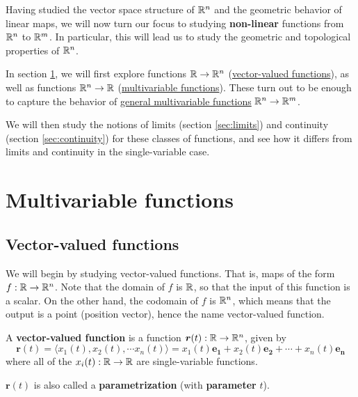 Having studied the vector space structure of $\mathbb{R}^n$ and the geometric behavior of linear maps, we will now turn our focus to studying  \textbf{non-linear}  functions from $\mathbb{R}^n$ to $\mathbb{R}^m$.  In particular, this will lead us to study the geometric and topological properties of $\mathbb{R}^n$. 

In section \ref{sec:multifunctions}, we will first explore functions $\mathbb{R} \to \mathbb{R}^n$ (\hyperref[vectorvaluedfunctions]{vector-valued functions}), as well as functions $\mathbb{R}^n \to \mathbb{R}$ (\hyperref[multivariablefunctions]{multivariable functions}).  These turn out to be enough to capture the behavior of \hyperref[generalmulti]{general multivariable functions} $\mathbb{R}^n \to \mathbb{R}^m$.

We will then study the notions of limits (section \ref{sec:limits}) and continuity  (section \ref{sec:continuity}) for these classes of functions, and see how it differs from limits and continuity in the single-variable case.


\section{Multivariable functions}\label{sec:multifunctions}

\subsection{Vector-valued functions}\label{vectorvaluedfunctions}

We will begin by studying vector-valued functions.  That is, maps of the form $f : \mathbb{R} \to \mathbb{R}^n$.  Note that the domain of $f$ is $\mathbb{R}$, so that the input of this function is a scalar.  On the other hand, the codomain of $f$ is $\mathbb{R}^n$, which means that the output is a point (position vector), hence the name vector-valued function. 

\begin{definition}
    A \textbf{vector-valued function} is a function $\bm{r}(t): \mathbb{R} \to \mathbb{R}^n$, given by
    $$\bm{r}(t) = \langle x_1(t),x_2(t), \cdots x_n(t) \rangle = x_1(t)\bm{e_1} + x_2(t)\bm{e_2} + \cdots + x_n(t)\bm{e_n}$$
    where all of the $x_i(t) : \mathbb{R} \to \mathbb{R}$ are single-variable functions.
    
    \vspace{1em}  
    $\bm{r}(t)$ is also called a \textbf{parametrization} (with \textbf{parameter} $t$).
    \end{definition}

